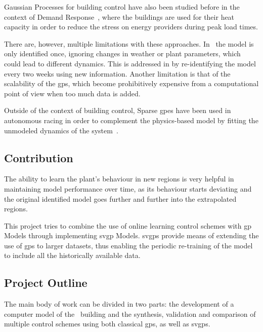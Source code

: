 Gaussian Processes for building control have also been studied before in the
context of Demand Response~\cite{nghiemDatadrivenDemandResponse2017,
jainLearningControlUsing2018}, where the buildings are used for their heat
capacity in order to reduce the stress on energy providers during peak load
times.

There are, however, multiple limitations with these approaches. 
In~\cite{nghiemDatadrivenDemandResponse2017} the model is only identified once,
ignoring changes in weather or plant parameters, which could lead to different
dynamics. This is addressed in \cite{jainLearningControlUsing2018} by
re-identifying the model every two weeks using new information. Another
limitation is that of the scalability of the \acrshort{gp}s, which become
prohibitively expensive from a computational point of view when too much data is
added.

Outside of the context of building control, Sparse \acrlong{gp}es have been used
in autonomous racing in order to complement the physics-based model by fitting
the unmodeled dynamics of the
system~\cite{kabzanLearningBasedModelPredictive2019}.

\subsection{Contribution}

The ability to learn the plant's behaviour in new regions is very helpful in
maintaining model performance over time, as its behaviour starts deviating and
the original identified model goes further and further into the extrapolated
regions.

This project tries to combine the use of online learning control schemes with
\acrlong{gp} Models through implementing \acrlong{svgp} Models. \acrshort{svgp}s
provide means of extending the use of \acrshort{gp}s to larger datasets, thus
enabling the periodic re-training of the model to include all the historically
available data.

\subsection{Project Outline}

The main body of work can be divided in two parts: the development of a computer
model of the \pdome\ building and the synthesis, validation and comparison of
multiple control schemes using both classical \acrshort{gp}s, as well as
\acrshort{svgp}s.

